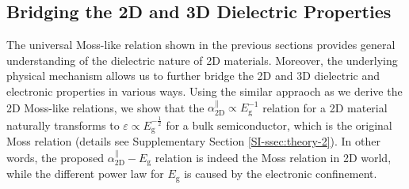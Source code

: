 \documentclass[journal=ancac3,manuscript=article,email=true,hyperref=true,keywords=false]{achemso}
\begin{document}
\subsection{Bridging the 2D and 3D Dielectric Properties}
\label{sec:2D-3D}

The universal Moss-like relation shown in the previous sections
provides general understanding of the dielectric nature of 2D
materials. Moreover, the underlying physical mechanism allows us to
further bridge the 2D and 3D dielectric and electronic properties in
various ways. Using the similar appraoch as we derive the 2D Moss-like
relations, we show that the
$\alpha_{\mathrm{2D}}^{\parallel} \propto E_{\mathrm{g}}^{-1}$
relation for a 2D material naturally transforms to
$\varepsilon \propto E_{\mathrm{g}}^{-\frac{1}{2}}$ for a bulk
semiconductor, which is the original Moss relation (details see
Supplementary Section \ref{SI-ssec:theory-2}). In other words, the
proposed $\alpha_{\mathrm{2D}}^{\parallel}-E_{\mathrm{g}}$ relation is
indeed the Moss relation in 2D world, while the different power law
for $E_{\mathrm{g}}$ is caused by the electronic confinement.
\end{document}
